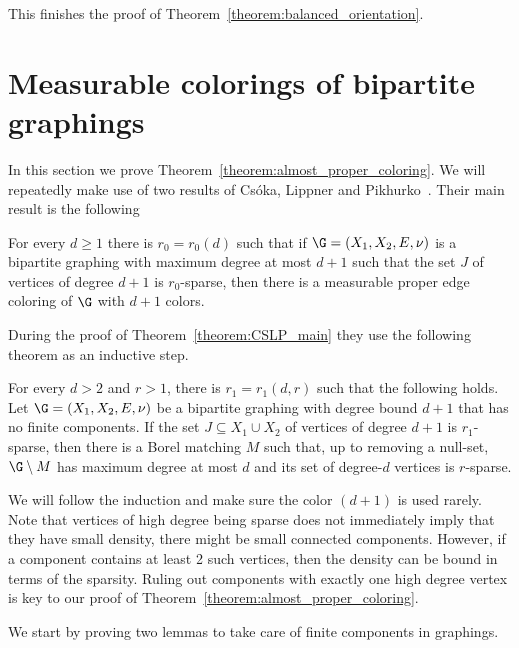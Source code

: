 
This finishes the proof of Theorem~\ref{theorem:balanced_orientation}.

\section{Measurable colorings of bipartite graphings} \label{section:coloring}

In this section we prove Theorem~\ref{theorem:almost_proper_coloring}. We will repeatedly make use of two results of Csóka, Lippner and Pikhurko~\cite[Theorems~1.9 and 4.2]{csoka2016kHonig}. Their main result is the following

\begin{theo}\label{theorem:CSLP_main}
For every $d \geq 1$ there is $r_0 = r_0(d)$ such that if $\G = (X_1, X_2,E,\linebreak\nu)$ is a bipartite graphing with maximum degree at most $d + 1$ such that the set $J$ of vertices of degree $d + 1$ is $r_0$-sparse, then there is a measurable proper edge coloring of $\G$ with $d+1$ colors.
\end{theo}

During the proof of Theorem~\ref{theorem:CSLP_main} they use the following theorem as an inductive step.

\begin{theo}\label{theorem:CSLP_induction}
For every $d > 2$ and $r > 1$, there is $r_1 = r_1(d, r)$ such that the following holds. Let $\G = (X_1,X_2, E, \nu)$ be a bipartite graphing with degree bound $d + 1$ that has no finite components. If the set $J \subseteq X_1 \cup X_2$ of vertices of degree $d + 1$ is $r_1$-sparse, then there is a Borel matching $M$ such that, up to removing a null-set, $\G \setminus M$ has maximum degree at most $d$ and its set of degree-$d$ vertices is $r$-sparse.
\end{theo}

We will follow the induction and make sure the color $(d+1)$ is used rarely. Note that vertices of high degree being sparse does not immediately imply that they have small density, there might be small connected components. However, if a component contains at least 2 such vertices, then the density can be bound in terms of the sparsity. Ruling out components with exactly one high degree vertex is key to our proof of Theorem~\ref{theorem:almost_proper_coloring}.

We start by proving two lemmas to take care of finite components in graphings.

